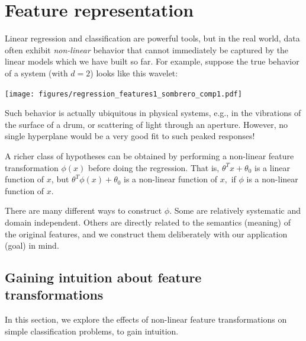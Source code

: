\chapter{Feature representation}
\label{chap-features}

Linear regression and classification are powerful tools, but in the real world, data often
exhibit {\em non-linear} behavior that cannot immediately be
captured by the linear models which we have built so far.  For example,
suppose the true behavior of a system (with $d=2$) looks like this
wavelet: 
%

\centerline{\texttt{[image: figures/regression\_features1\_sombrero\_comp1.pdf]}}

\noindent
Such behavior is actually ubiquitous in physical systems, e.g., in the
vibrations of the surface of a drum, or scattering of light through an
aperture.  However, no single hyperplane would be a very good fit to
such peaked responses!

A richer class of hypotheses can be obtained by performing a
non-linear feature transformation $\phi(x)$ before doing the
regression. That is, $\theta^Tx + \theta_0$ is a linear function of
$x$, but $\theta^T\phi(x) + \theta_0$ is a non-linear function of $x,$
if $\phi$ is a non-linear function of $x$.

There are many different ways to construct $\phi$.  Some are
relatively systematic and domain independent.
Others are directly related to the semantics (meaning) of the original
features, and we construct them deliberately with our application (goal) in mind.

\section{Gaining intuition about feature transformations}

\label{sec-features_classifiers}

In this section, we explore the effects of non-linear feature
transformations on simple classification problems, to gain intuition.




